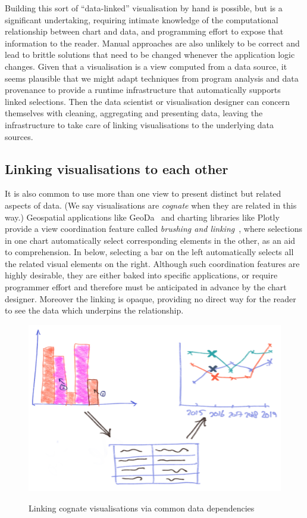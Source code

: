 Building this sort of ``data-linked'' visualisation by hand is possible, but is a significant undertaking, requiring intimate knowledge of the computational relationship between chart and data, and programming effort to expose that information to the reader. Manual approaches are also unlikely to be correct and lead to brittle solutions that need to be changed whenever the application logic changes. Given that a visualisation is a view computed from a data source, it seems plausible that we might adapt techniques from program analysis and data provenance to provide a runtime infrastructure that automatically supports linked selections. Then the data scientist or visualisation designer can concern themselves with cleaning, aggregating and presenting data, leaving the infrastructure to take care of linking visualisations to the underlying data sources.

\subsection{Linking visualisations to each other}

It is also common to use more than one view to present distinct but related aspects of data. (We say visualisations are \emph{cognate} when they are related in this way.) Geospatial applications like GeoDa~\cite{anselin06} and charting libraries like Plotly provide a view coordination feature called \emph{brushing and linking}~\cite{becker87}, where selections in one chart automatically select corresponding elements in the other, as an aid to comprehension. In  below, selecting a bar on the left automatically selects all the related visual elements on the right. Although such coordination features are highly desirable, they are either baked into specific applications, or require programmer effort and therefore must be anticipated in advance by the chart designer. Moreover the linking is opaque, providing no direct way for the reader to see the data which underpins the relationship.

\begin{figure}[H]
   {\includegraphics[scale=0.14]{fig/example/vis-linking.png}}
   \caption{Linking cognate visualisations via common data dependencies}
   \label{fig:introduction:vis-linking}
\end{figure}

